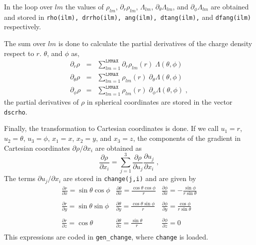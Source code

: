 \documentclass{article}
\begin{document}
In the loop over $lm$ the values of $\rho_{lm}$,
$\partial_r\rho_{lm}$, $\Lambda_{lm}$,
$\partial_{\theta}\Lambda_{lm}$, and
$\partial_{\phi}\Lambda_{lm}$ are obtained and stored in
\texttt{rho(ilm), drrho(ilm), ang(ilm), dtang(ilm),} and
\texttt{dfang(ilm)} respectively.

The sum over $lm$ is done to calculate the partial derivatives of the
charge density respect to $r$. $\theta$, and $\phi$ as,
\begin{eqnarray}
\partial_{r}\rho&=&\sum_{lm=1}^{\mathtt{LMMAX}} 
\partial_r\rho_{lm}(r)\;\Lambda(\theta,\phi)
\\
\partial_{\theta}\rho&=&\sum_{lm=1}^{\mathtt{LMMAX}} 
\rho_{lm}(r)\;\partial_{\theta}\Lambda(\theta,\phi)
\\
\partial_{\phi}\rho&=&\sum_{lm=1}^{\mathtt{LMMAX}} 
\rho_{lm}(r)\;\partial_{\phi}\Lambda(\theta,\phi)\;,
\end{eqnarray}
the partial derivatives of $\rho$ in spherical coordinates are stored
in the vector \texttt{dscrho}.

Finally, the transformation to Cartesian coordinates is done. If we
call $u_1=r$, $u_2=\theta$, $u_3=\phi$, $x_1=x$, $x_2=y$, and $x_3=z$,
the components of the gradient in Cartesian coordinates
$\partial\rho/\partial x_i$ are obtained as
\[
\frac{\partial\rho}{\partial x_i}=\sum_{j=1}^3
\frac{\partial\rho}{\partial u_j} \frac{\partial u_j}{\partial x_i}\;,
\]
The terms $\partial u_j/\partial x_i$ are stored in
\texttt{change(j,i)} and are given by
\[
\begin{array}{lll}
\displaystyle 
\frac{\partial r}{\partial x}=\sin{\theta}\cos{\phi} & 
\displaystyle 
\frac{\partial\theta}{\partial x}=\frac{\cos{\theta}\cos{\phi}}{r} &
\displaystyle 
\frac{\partial\phi}{\partial x}=-\frac{\sin{\phi}}{r\sin{\theta}} \\
~\\
\displaystyle 
\frac{\partial r}{\partial y}=\sin{\theta}\sin{\phi} & 
\displaystyle 
\frac{\partial\theta}{\partial y}=\frac{\cos{\theta}\sin{\phi}}{r} &
\displaystyle 
\frac{\partial\phi}{\partial y}=\frac{\cos{\phi}}{r\sin{\theta}} \\
~\\
\displaystyle 
\frac{\partial r}{\partial z}=\cos{\theta} & 
\displaystyle 
\frac{\partial\theta}{\partial z}=\frac{\sin{\theta}}{r} &
\displaystyle 
\frac{\partial\phi}{\partial z}=0 \\
\end{array}
\]
This expressions are coded in \texttt{gen\_change}, where
\texttt{change} is loaded.
\end{document}
